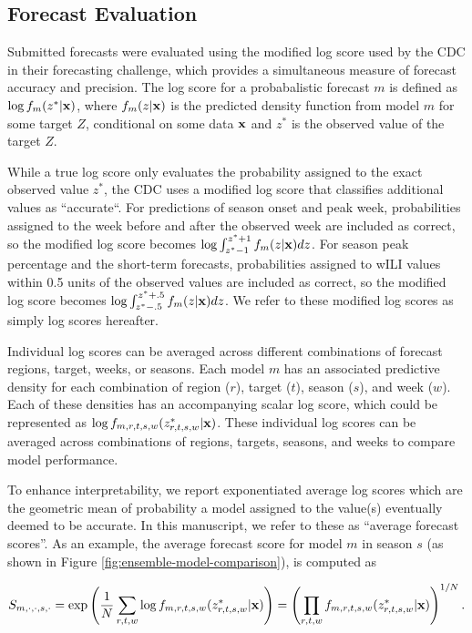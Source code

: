 \documentclass{article}\usepackage[]{graphicx}\usepackage[]{color}
\begin{document}
\subsection{Forecast Evaluation}
Submitted forecasts were evaluated using the modified log score used by the CDC in their forecasting challenge, which provides a simultaneous measure of forecast accuracy and precision. The log score for a probabalistic forecast $m$ is defined as $\log f_m(z^*|\bf{x})$, where $f_m(z|\bf{x})$ is the predicted density function from model $m$ for some target $Z$, conditional on some data $\bf{x}$ and $z^*$ is the observed value of the target $Z$. 

While a true log score only evaluates the probability assigned to the exact observed value $z^*$, the CDC uses a modified log score that classifies additional values as ``accurate``. For predictions of season onset and peak week, probabilities assigned to the week before and after the observed week are included as correct, so the modified log score becomes $\log \int_{z^* -1}^{z^* + 1} f_m(z|{\bf{x}})dz$. For season peak percentage and the short-term forecasts, probabilities assigned to wILI values within 0.5 units of the observed values are included as correct, so the modified log score becomes $\log \int_{z^* -.5}^{z^* + .5} f_m(z|{\bf{x}})dz$. We refer to these modified log scores as simply log scores hereafter.

Individual log scores can be averaged across different combinations of forecast regions, target, weeks, or seasons. Each model $m$ has an associated predictive density for each combination of region ($r$), target ($t$), season ($s$), and week ($w$). Each of these densities has an accompanying scalar log score, which could be represented as $\log f_{m,r,t,s,w}(z^*_{r,t,s,w}|\bf{x})$. These individual log scores can be averaged across combinations of regions, targets, seasons, and weeks to compare model performance.

To enhance interpretability, we report exponentiated average log scores which are the geometric mean of probability a model assigned to the value(s) eventually deemed to be accurate. In this manuscript, we refer to these as ``average forecast scores''. As an example, the average forecast score for model $m$ in season $s$ (as shown in Figure \ref{fig:ensemble-model-comparison}), is computed as 

\begin{equation}
S_{m,\cdot,\cdot,s,\cdot} = \exp \left ( \frac{1}{N} \sum_{r,t,w} \log f_{m,r,t,s,w}(z^*_{r,t,s,w}|{\bf x}) \right ) 
  =  \left ( \prod_{r,t,w}  f_{m,r,t,s,w}(z^*_{r,t,s,w}|{\bf x}) \right ) ^{1/N}. 
\end{equation}
\end{document}
